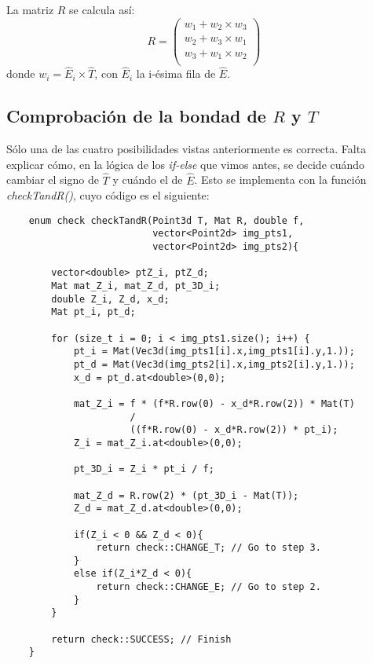 \documentclass[a4paper, 11pt]{article}
\theoremstyle{definition}
\theoremstyle{theorem}
\begin{document}
    La matriz $R$ se calcula así:
    \[
    R = \left(
    \begin{array}{c}
        w_1 + w_2 \times w_3 \\
        w_2 + w_3 \times w_1 \\
        w_3 + w_1 \times w_2 \\
    \end{array}
    \right)
    \]
    donde $w_i = \hat{E}_i \times \hat{T}$, con $\hat{E}_i$ la i-ésima fila de $\hat{E}$.

    \subsection{Comprobación de la bondad de $R$ y $T$}
    Sólo una de las cuatro posibilidades vistas anteriormente es correcta. Falta explicar cómo, en la lógica de los \emph{if-else} que vimos antes, se decide cuándo cambiar el signo de $\hat{T}$ y cuándo el de $\hat{E}$. Esto se implementa con la función \emph{checkTandR()}, cuyo código es el siguiente:
    \begin{lstlisting}
    enum check checkTandR(Point3d T, Mat R, double f,
                          vector<Point2d> img_pts1,
                          vector<Point2d> img_pts2){

        vector<double> ptZ_i, ptZ_d;
        Mat mat_Z_i, mat_Z_d, pt_3D_i;
        double Z_i, Z_d, x_d;
        Mat pt_i, pt_d;

        for (size_t i = 0; i < img_pts1.size(); i++) {
            pt_i = Mat(Vec3d(img_pts1[i].x,img_pts1[i].y,1.));
            pt_d = Mat(Vec3d(img_pts2[i].x,img_pts2[i].y,1.));
            x_d = pt_d.at<double>(0,0);

            mat_Z_i = f * (f*R.row(0) - x_d*R.row(2)) * Mat(T)
                      /
                      ((f*R.row(0) - x_d*R.row(2)) * pt_i);
            Z_i = mat_Z_i.at<double>(0,0);

            pt_3D_i = Z_i * pt_i / f;

            mat_Z_d = R.row(2) * (pt_3D_i - Mat(T));
            Z_d = mat_Z_d.at<double>(0,0);

            if(Z_i < 0 && Z_d < 0){
                return check::CHANGE_T; // Go to step 3.
            }
            else if(Z_i*Z_d < 0){
                return check::CHANGE_E; // Go to step 2.
            }
        }

        return check::SUCCESS; // Finish
    }
    \end{lstlisting}
\end{document}
